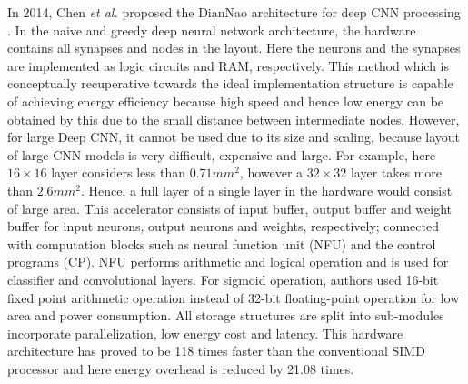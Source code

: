 \documentclass[journal]{IEEEtran}
\begin{document}
\par In 2014, Chen \textit{et al.} proposed the DianNao architecture for deep CNN processing \cite{paper21}. In the naive and greedy deep neural network architecture, the hardware contains all synapses and nodes in the layout. Here the neurons and the synapses are implemented as logic circuits and RAM, respectively. This method which is conceptually recuperative towards the ideal implementation structure is capable of achieving energy efficiency because high speed and hence low energy can be obtained by this due to the small distance between intermediate nodes. However, for large Deep CNN, it cannot be used due to its size and scaling, because layout of large CNN models is very difficult, expensive and large. For example, here $16 \times 16$ layer considers less than $0.71mm^{2}$, however a $32 \times 32$ layer takes  more than $2.6mm^{2}$. Hence, a full layer of a single layer in the hardware would consist of large area. This accelerator consists of input buffer, output buffer and weight buffer for input neurons, output neurons and weights, respectively; connected with computation blocks such as neural function unit (NFU) and the control programs (CP). NFU performs arithmetic and logical operation and is used for classifier and convolutional layers. For sigmoid operation, authors used 16-bit fixed point arithmetic operation instead of 32-bit floating-point operation for low area and power consumption. All storage structures are split into sub-modules incorporate parallelization, low energy cost and latency. This hardware architecture has proved to be 118 times faster than the conventional SIMD processor and here energy overhead is reduced by 21.08 times. 
\end{document}
